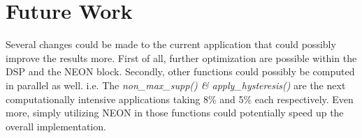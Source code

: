 \section{Future Work}
\label{sec:Future Work}
Several changes could be made to the current application that could possibly improve the results more.
First of all, further optimization are possible within the DSP and the NEON block. Secondly, other functions could possibly be computed in parallel as well.
i.e. The \textit{non\_max\_supp() \& apply\_hysteresis()} are the next computationally intensive applications taking 8\% and 5\% each respectively.
Even more, simply utilizing NEON in those functions could potentially speed up the overall implementation.